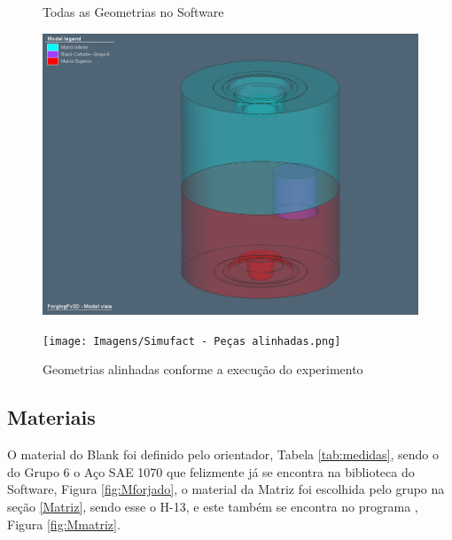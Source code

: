 \documentclass[deposito, acronym, symbols]{fei}
\begin{document}
\begin{figure}[!htp]
  \centering
  \begin{minipage}{0.4\textwidth}
    \centering
    \caption{Todas as Geometrias no Software}
    \includegraphics[width=1\linewidth]{Imagens/Simufact - Geometrias.png}
    \label{fig:Geometrias}
  \end{minipage}
  \hfill
  \begin{minipage}{0.4\textwidth}
        \caption{Geometrias alinhadas conforme a execução do experimento}
    \texttt{[image: Imagens/Simufact - Peças alinhadas.png]}
    \label{fig:Alinhadas}
  \end{minipage}
\end{figure}

\newpage

\subsection{Materiais}

O material do Blank foi definido pelo orientador, Tabela \ref{tab:medidas}, sendo o do Grupo 6 o Aço SAE 1070 que felizmente já se encontra na biblioteca do Software, Figura \ref{fig:Mforjado}, o material da Matriz foi escolhida pelo grupo na seção \ref{Matriz}, sendo esse o H-13, e este também se encontra no programa , Figura \ref{fig:Mmatriz}.
\end{document}
